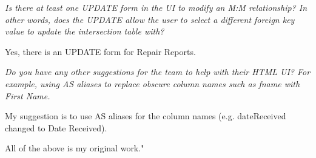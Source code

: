 \documentclass{article}
\begin{document}
\begin{tcolorbox}[colback=secondarycolor, colframe=primarycolor, title=\textbf{Step 3: Peer Review 2 - Paula Tica}]
\vspace{0.2cm}
\textit{Is there at least one UPDATE form in the UI to modify an M:M relationship? In other words, does the UPDATE allow the user to select a different foreign key value to update the intersection table with?}

\vspace{0.05cm}
Yes, there is an UPDATE form for Repair Reports.

\vspace{0.2cm}
\textit{Do you have any other suggestions for the team to help with their HTML UI? For example, using AS aliases to replace obscure column names such as fname with First Name.}

\vspace{0.05cm}
My suggestion is to use AS aliases for the column names (e.g. dateReceived changed to Date Received).

\vspace{0.05cm}
All of the above is my original work."

\end{tcolorbox}

\vspace{0.2cm}
\end{document}
